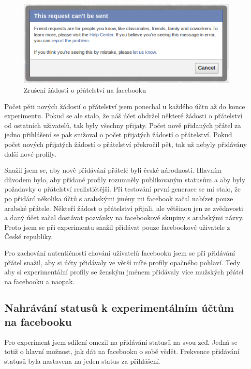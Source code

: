 \documentclass[thesis=M,czech]{FITthesis}[2013/05/10]
\begin{document}
\begin{figure}[h]
\begin{center}
\includegraphics[width=5in]{figures/cantFriend.png}
\caption{Zrušení žádosti o přátelství na facebooku}
\label{fig:cantFriend}
\end{center}
\end{figure}

Počet pěti nových žádostí o přátelství jsem ponechal u každého účtu až do konce experimentu. Pokud se ale stalo, že náš účet obdržel některé žádosti o přátelství od ostatních uživatelů, tak byly všechny přijaty. Počet nově přidaných přátel za jedno přihlášení se pak snižoval o počet přijatých žádostí o přátelství. Pokud počet nových přijatých žádostí o přátelství překročil pět, tak už nebyly přidávány další nové profily.

Snažil jsem se, aby nově přidávání přátelé byli české národnosti. Hlavním důvodem bylo, aby přidané profily rozumněly publikovaným statusům a aby byly požadavky o přátelství realističtější. Při testování první generace se mi stalo, že po přidání několika účtů s arabskými jmény mi facebook začal nabízet pouze arabské přátele. Někteří žádost o přátelství přijali, ale většinou jen ze zvědavosti a daný účet začal dostávat pozvánky na facebookové skupiny s arabskými názvy. Proto jsem se při experimentu snažil přidávat pouze facebookové uživatele z České republiky.

Pro zachování autentičnosti chování uživatelů facebooku jsem se při přidávání přátel snažil, aby si účty přidávaly ve větší míře profily opačného pohlaví. Tedy aby si experimentální profily se ženským jménem přidávaly více mužských přátel na facebooku a naopak. 

\subsection{Nahrávání statusů k experimentálním účtům na facebooku}

Pro experiment jsem sdílení omezil na přidávání statusů na svou zeď. Jedná se totiž o hlavní možnost, jak dát na facebooku o sobě vědět. Frekvence přidávání statusů byla nastavena na jeden status za přihlášení. 
\end{document}
